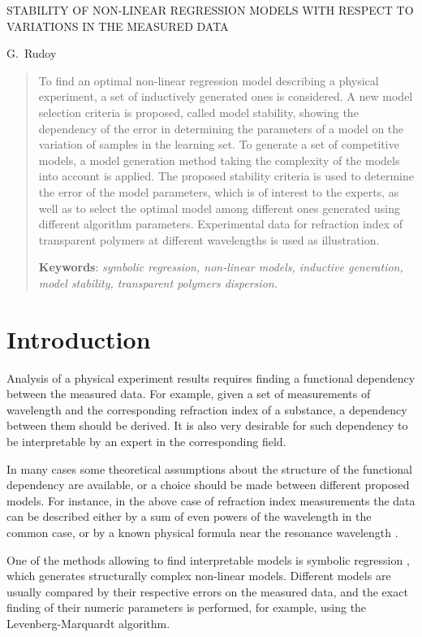 \documentclass[11pt,a4paper]{article}
\theoremstyle{definition}
\begin{document}
\begin{center}
  STABILITY OF NON-LINEAR REGRESSION MODELS WITH RESPECT TO VARIATIONS IN THE MEASURED DATA

  \bigskip
  G.~Rudoy
\end{center}

\begin{abstract}
  To find an optimal non-linear regression model describing a physical experiment, a set
  of inductively generated ones is considered.
  A new model selection criteria is proposed, called model stability, showing the
  dependency of the error in determining the parameters of a model on the variation of
  samples in the learning set.
  To generate a set of competitive models, a model generation method taking the complexity
  of the models into account is applied. The proposed stability criteria
  is used to determine the error of the model parameters, which is of interest
  to the experts, as well as to select the optimal model among different ones generated
  using different algorithm parameters.
  Experimental data for refraction index of transparent polymers at different wavelengths is
  used as illustration.

  \bigskip
  \textbf{Keywords}: \emph{symbolic regression, non-linear models, inductive generation,
	model stability, transparent polymers dispersion.}
\end{abstract}

\section*{Introduction}

Analysis of a physical experiment results requires finding a functional
dependency between the measured data. For example, given a set of measurements
of wavelength and the corresponding refraction index of a substance, a dependency
between them should be derived. It is also very desirable for such dependency to
be interpretable by an expert in the corresponding field.

In many cases some
theoretical assumptions about the structure of the functional dependency are available,
or a choice should be made between different proposed models. For instance, in the above
case of refraction index measurements the data can be described either by a sum
of even powers of the wavelength in the common case, or by a known physical formula
near the resonance wavelength \cite{...}.

One of the methods allowing to find interpretable models is symbolic regression
\cite{davidson:2000:snrea,reference/ml/X10vc,StrijovW10,Strijov08InductMethods,Rudoy13},
which generates structurally complex non-linear models. Different models
are usually compared by their respective errors on the measured data,
and the exact finding of their numeric parameters is performed, for example, using
the Levenberg-Marquardt algorithm\cite{Marquardt1963Algorithm,more:78}.
\end{document}
